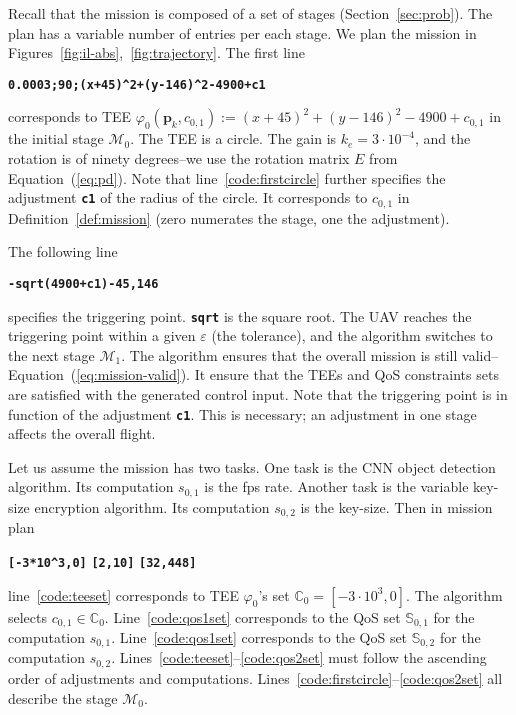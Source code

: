 \documentclass[letterpaper,10pt,conference]{ieeeconf}
\theoremstyle{definition}
\begin{document}
Recall that the mission is composed of a set of stages (Section~\ref{sec:prob}). The plan has a variable number of entries per each stage. We plan the mission in Figures~\ref{fig:il-abs},~\ref{fig:trajectory}. The first line
\begin{algorithmic}[1]
  \State\textbf{\texttt{0.0003;90;(x+45)\^{}2+(y-146)\^{}2-4900+c1}}\label{code:firstcircle}
\end{algorithmic}
corresponds to TEE $\varphi_0(\mathbf{p}_k,c_{0,1}):=(x+45)^2+(y-146)^2-4900+c_{0,1}$ in the initial stage $\mathcal{M}_0$. The TEE is a circle. The gain is $k_e=3\cdot 10^{-4}$, and the rotation is of ninety degrees--we use the rotation matrix $E$ from Equation~(\ref{eq:pd}). Note that line~\ref{code:firstcircle} further specifies the adjustment {\tt\textbf{c1}} of the radius of the circle. It corresponds to $c_{0,1}$ in Definition~\ref{def:mission} (zero numerates the stage, one the adjustment).

The following line
\begin{algorithmic}[1]
  \State\textbf{\texttt{-sqrt(4900+c1)-45,146}}\label{code:trigger}
\end{algorithmic}
specifies the triggering point. {\tt\textbf{sqrt}} is the square root. The UAV reaches the triggering point within a given $\varepsilon$ (the tolerance), and the algorithm switches to the next stage $\mathcal{M}_1$. The algorithm ensures that the overall mission is still valid--Equation~(\ref{eq:mission-valid}). It ensure that the TEEs and QoS constraints sets are satisfied with the generated control input. Note that the triggering point is in function of the adjustment {\tt\textbf{c1}}. This is necessary; an adjustment in one stage affects the overall flight.

Let us assume the mission has two tasks. One task is the CNN object detection algorithm. Its computation $s_{0,1}$ is the fps rate. Another task is the variable key-size encryption algorithm. Its computation $s_{0,2}$ is the key-size. Then in mission plan
\begin{algorithmic}[1]
  \State\textbf{\texttt{[-3*10\^{}3,0]}}\label{code:teeset}
  \State\textbf{\texttt{[2,10]}}\label{code:qos1set}
  \State\textbf{\texttt{[32,448]}}\label{code:qos2set}
\end{algorithmic}
line~\ref{code:teeset} corresponds to TEE $\varphi_0$'s set $\mathbb{C}_0=[-3\cdot10^3,0]$. The algorithm selects $c_{0,1}\in\mathbb{C}_0$. Line~\ref{code:qos1set} corresponds to the QoS set $\mathbb{S}_{0,1}$ for the computation $s_{0,1}$. Line~\ref{code:qos1set} corresponds to the QoS set $\mathbb{S}_{0,2}$ for the computation $s_{0,2}$. Lines~\ref{code:teeset}--\ref{code:qos2set} must follow the ascending order of adjustments and computations. Lines~\ref{code:firstcircle}--\ref{code:qos2set} all describe the stage $\mathcal{M}_0$.
\end{document}
